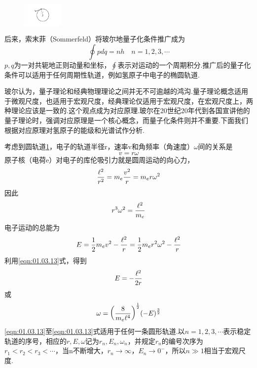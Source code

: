 \begin{figure}
	\centering
	\includegraphics[width=2cm,clip]{QM file/figure/1-6}
	\caption{}
	\label{fig.1-6}
\end{figure}
后来，索末菲（Sommerfeld）将玻尔地量子化条件推广成为
\begin{equation}\label{eqn:01.03.11}
	\oint pdq =nh\quad n=1,2,3,\cdots
\end{equation}\eqshort
$p,q$为一对共轭地正则动量和坐标，$\oint$表示对运动的一个周期积分.推广后的量子化条件可以适用于任何周期性轨道，例如氢原子中电子的椭圆轨道.

玻尔认为，量子理论和经典物理理论之间并无不可逾越的鸿沟.量子理论概念适用于微观尺度，也适用于宏观尺度，经典理论仅适用于宏观尺度，在宏观尺度上，两种理论应该是一致的.这个观点成为对应原理.玻尔在20世纪20年代到各国宣讲他的量子理论时，强调对应原理是一个核心概念，而量子化条件则并不重要.下面我们根据对应原理对氢原子的能级和光谱试作分析.

考虑到圆轨道\ref{fig.1-6}，电子的轨道半径r，速率v和角频率（角速度）$\omega$间的关系是
\begin{equation}\label{eqn:01.03.12}
	v=r\omega
\end{equation}
\eqnormal
原子核（电荷e）对电子的库伦吸引力就是圆周运动的向心力，
\begin{equation*}
	\frac{\ell^{2}}{r^{2}}=m_{e}\frac{v^{2}}{r}=m_{e}r\omega^{2}
\end{equation*}\eqshort
因此
\begin{equation}\label{eqn:01.03.13}
	r^{3}\omega^{2}=\frac{\ell^{2}}{m_{e}}
\end{equation}\eqnormal
电子运动的总能为
\begin{equation*}
	E=\frac{1}{2}m_{e}v^{2}-\frac{\ell^{2}}{r}=\frac{1}{2}m_{e}r^{2}\omega^{2}-\frac{\ell^{2}}{r}
\end{equation*}\eqshort
利用\eqref{eqn:01.03.13}式，得到
\begin{equation}\label{eqn:01.03.14}
	E=-\frac{\ell^{2}}{2r}
\end{equation}\eqnormal
或
\begin{equation}\label{eqn:01.03.15}
	\omega=\bigg(\frac{8}{m_{e} \ell^{4}}\bigg)^{\frac{1}{2}}(-E)^{\frac{3}{2}}
\end{equation}
\eqref{eqn:01.03.13}至\eqref{eqn:01.03.13}式适用于任何一条圆形轨道.以$n=1,2,3,\cdots$表示稳定轨道的序号，相应的$r,E,\omega$记为$r_{n},E_{n},\omega_{n}$，并规定$r_{n}$的编号次序为$r_1 < r_2 < r_3<\cdots$，当n不断增大，$r_{n}\rightarrow\infty$，$E_{n}\rightarrow 0^{-}$，所以$n\gg 1$相当于宏观尺度.

